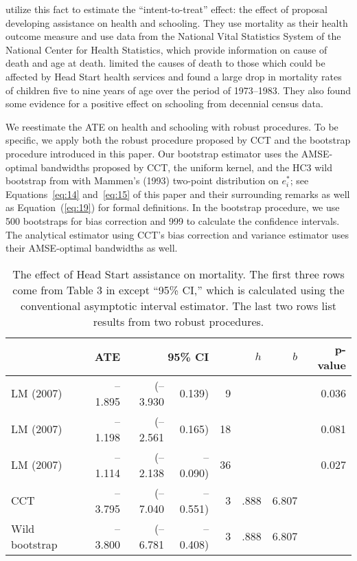 \documentclass[12pt,fleqn]{article}
\begin{document}
\cite{ludwig2007} utilize this fact to estimate the ``intent-to-treat'' effect:
the effect of proposal developing assistance on health and schooling. They use
mortality as their health outcome measure and use data from the National Vital
Statistics System of the National Center for Health Statistics, which provide
information on cause of death and age at death. \cite{ludwig2007} limited the
causes of death to those which could be affected by Head Start health services
and found a large drop in mortality rates of children five to nine years of age
over the period of 1973--1983. They also found some evidence for a positive
effect on schooling from decennial census data.

We reestimate the ATE on health and schooling with robust procedures. To be
specific, we apply both the robust procedure proposed by CCT and the bootstrap
procedure introduced in this paper.  Our bootstrap estimator uses the
AMSE-optimal bandwidths proposed by CCT, the uniform kernel, and the HC3 wild
bootstrap from \citet{DF08} with Mammen's (1993) two-point distribution
on $e^*_i$; see Equations~\eqref{eq:14} and~\eqref{eq:15} of
this paper and their surrounding remarks as well as Equation~(\ref{eq:19}) for
formal definitions. In the bootstrap
procedure, we use 500 bootstraps for bias correction and 999 to calculate the
confidence intervals. The analytical estimator using CCT's bias correction and
variance estimator uses
their AMSE-optimal bandwidths as well.

\begin{table}[t]
  \centering
  \begin{tabular}{lrr@{, }rr@{}rrr}
    \toprule
                      & ATE     & \multicolumn{2}{r}{95\% CI}            &     &  $h$ &   $b$ & p-value \\
    \midrule
    LM (2007)         & --1.895 & (--3.930                    & 0.139)   & 9   &      &       & 0.036 \\
    LM (2007)         & --1.198 & (--2.561                    & 0.165)   & 18  &      &       & 0.081 \\
    LM (2007)         & --1.114 & (--2.138                    & --0.090) & 36  &      &       & 0.027 \\
    CCT               & --3.795 & (--7.040                    & --0.551) & 3   & .888 & 6.807 &       \\ 
    Wild bootstrap    & --3.800 & (--6.781                    & --0.408) & 3   & .888 & 6.807 &       \\
    \bottomrule
  \end{tabular}
  \caption{The effect of Head Start assistance on mortality. The first three
    rows come from Table 3 in \cite{ludwig2007} except ``95\% CI,'' which is
    calculated using the conventional asymptotic interval estimator.
    The last two rows list results from two robust procedures.}
  \label{tbl:2}
\end{table}
\end{document}
